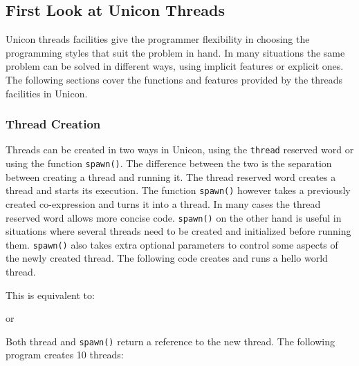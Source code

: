 \subsection[First Look at Unicon Threads]{First Look at Unicon Threads}

Unicon threads facilities give the programmer flexibility in choosing
the programming styles that suit the problem in hand. In many
situations the same problem can be solved in different ways, using
implicit features or explicit ones. The following sections cover the
functions and features provided by the threads facilities in Unicon.

\subsubsection{Thread Creation}

Threads can be created in two ways in Unicon, using the
\texttt{thread} reserved word or using the function
\texttt{spawn()}. The difference between the two is the
separation between creating a thread and running it. The thread
reserved word creates a thread and starts its execution. The function
\texttt{spawn()} however takes a previously created
co-expression and turns it into a thread. In many cases the thread
reserved word allows more concise code. \texttt{spawn()} on
the other hand is useful in situations where several threads need to be
created and initialized before running them.
\texttt{spawn()} also takes extra optional parameters
to control some aspects of the newly created thread. The following code
creates and runs a hello world thread.


\noindent This is equivalent to:


\noindent or


Both thread and \texttt{spawn()} return a reference to the
new thread. The following program creates 10 threads: 


